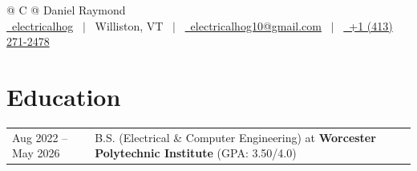 \documentclass[a4paper,8makept]{article}
\begin{document}
\pagestyle{empty}


\begin{tabularx}{\linewidth}{@{} C @{}}
  \Huge{Daniel Raymond}                                                         \\[7.5pt]
  \href{https://github.com/electricalhog}{\raisebox{-0.05\height}\faGithub\ electricalhog} \ $|$ \
  Williston, VT \ $|$ \
  \href{mailto:electricalhog10@gmail.com}{\raisebox{-0.05\height}\faEnvelope \ electricalhog10@gmail.com} \ $|$ \
  \href{tel:+14132712478}{\raisebox{-0.05\height}\faMobile \ +1 (413) 271-2478} \\
\end{tabularx}


\section{Education}
\begin{tabularx}{\linewidth}{@{}l X@{}}
  Aug 2022 -- May 2026 & B.S. (Electrical \& Computer Engineering) at \textbf{Worcester Polytechnic Institute} \hfill \normalsize(GPA: 3.50/4.0) \\
\end{tabularx}
\end{document}
